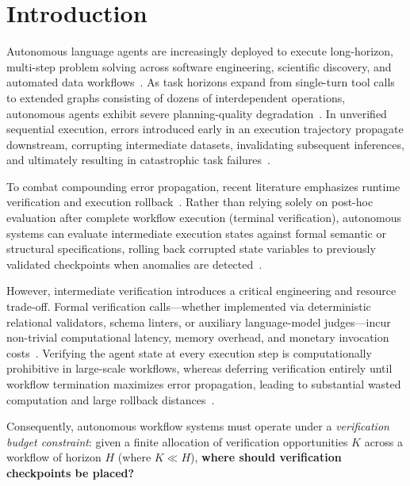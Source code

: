 \section{Introduction}
\label{sec:introduction}

Autonomous language agents are increasingly deployed to execute long-horizon, multi-step problem solving across software engineering, scientific discovery, and automated data workflows~\citep{pushkin2026lead,zhao2026scienceflow,afoud2026vreact}. As task horizons expand from single-turn tool calls to extended graphs consisting of dozens of interdependent operations, autonomous agents exhibit severe planning-quality degradation~\citep{wang2026reasoning,chen2026horizon}. In unverified sequential execution, errors introduced early in an execution trajectory propagate downstream, corrupting intermediate datasets, invalidating subsequent inferences, and ultimately resulting in catastrophic task failures~\citep{sinha2025illusion,venkataramani2026masprove}.

To combat compounding error propagation, recent literature emphasizes runtime verification and execution rollback~\citep{zhuang2026agentrewind,yu2026rir}. Rather than relying solely on post-hoc evaluation after complete workflow execution (terminal verification), autonomous systems can evaluate intermediate execution states against formal semantic or structural specifications, rolling back corrupted state variables to previously validated checkpoints when anomalies are detected~\citep{shoham2026jevact,afoud2026vreact}.

However, intermediate verification introduces a critical engineering and resource trade-off. Formal verification calls—whether implemented via deterministic relational validators, schema linters, or auxiliary language-model judges—incur non-trivial computational latency, memory overhead, and monetary invocation costs~\citep{venkataramani2026masprove,yang2025agenticrobot}. Verifying the agent state at every execution step is computationally prohibitive in large-scale workflows, whereas deferring verification entirely until workflow termination maximizes error propagation, leading to substantial wasted computation and large rollback distances~\citep{pushkin2026lead,zhuang2026agentrewind}.

Consequently, autonomous workflow systems must operate under a \emph{verification budget constraint}: given a finite allocation of verification opportunities $K$ across a workflow of horizon $H$ (where $K \ll H$), \textbf{where should verification checkpoints be placed?}

